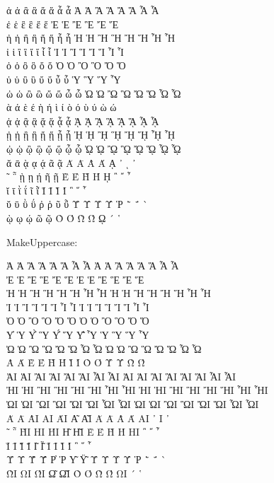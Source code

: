 \documentclass[a4paper]{article}
\begin{document}
ἀ ἁ ἂ ἃ ἄ ἅ ἆ ἇ Ἀ Ἁ Ἂ Ἃ Ἄ Ἅ Ἆ Ἇ \\
ἐ ἑ ἒ ἓ ἔ ἕ     Ἐ Ἑ Ἒ Ἓ Ἔ Ἕ     \\
ἠ ἡ ἢ ἣ ἤ ἥ ἦ ἧ Ἠ Ἡ Ἢ Ἣ Ἤ Ἥ Ἦ Ἧ \\
ἰ ἱ ἲ ἳ ἴ ἵ ἶ ἷ Ἰ Ἱ Ἲ Ἳ Ἴ Ἵ Ἶ Ἷ \\
ὀ ὁ ὂ ὃ ὄ ὅ     Ὀ Ὁ Ὂ Ὃ Ὄ Ὅ     \\
ὐ ὑ ὒ ὓ ὔ ὕ ὖ ὗ   Ὑ   Ὓ   Ὕ   Ὗ \\
ὠ ὡ ὢ ὣ ὤ ὥ ὦ ὧ Ὠ Ὡ Ὢ Ὣ Ὤ Ὥ Ὦ Ὧ \\
ὰ ά ὲ έ ὴ ή ὶ ί ὸ ό ὺ ύ ὼ ώ     \\
ᾀ ᾁ ᾂ ᾃ ᾄ ᾅ ᾆ ᾇ ᾈ ᾉ ᾊ ᾋ ᾌ ᾍ ᾎ ᾏ \\
ᾐ ᾑ ᾒ ᾓ ᾔ ᾕ ᾖ ᾗ ᾘ ᾙ ᾚ ᾛ ᾜ ᾝ ᾞ ᾟ \\
ᾠ ᾡ ᾢ ᾣ ᾤ ᾥ ᾦ ᾧ ᾨ ᾩ ᾪ ᾫ ᾬ ᾭ ᾮ ᾯ \\
ᾰ ᾱ ᾲ ᾳ ᾴ   ᾶ ᾷ Ᾰ Ᾱ Ὰ Ά ᾼ ᾽ ι ᾿ \\
῀ ῁ ῂ ῃ ῄ   ῆ ῇ Ὲ Έ Ὴ Ή ῌ ῍ ῎ ῏ \\
ῐ ῑ ῒ ΐ     ῖ ῗ Ῐ Ῑ Ὶ Ί   ῝ ῞ ῟ \\
ῠ ῡ ῢ ΰ ῤ ῥ ῦ ῧ Ῠ Ῡ Ὺ Ύ Ῥ ῭ ΅ ` \\
    ῲ ῳ ῴ   ῶ ῷ Ὸ Ό Ὼ Ώ ῼ ´ ῾

MakeUppercase:


\MakeUppercase{ ἀ ἁ ἂ ἃ ἄ ἅ ἆ ἇ Ἀ Ἁ Ἂ Ἃ Ἄ Ἅ Ἆ Ἇ }\\
\MakeUppercase{ ἐ ἑ ἒ ἓ ἔ ἕ     Ἐ Ἑ Ἒ Ἓ Ἔ Ἕ     }\\
\MakeUppercase{ ἠ ἡ ἢ ἣ ἤ ἥ ἦ ἧ Ἠ Ἡ Ἢ Ἣ Ἤ Ἥ Ἦ Ἧ }\\
\MakeUppercase{ ἰ ἱ ἲ ἳ ἴ ἵ ἶ ἷ Ἰ Ἱ Ἲ Ἳ Ἴ Ἵ Ἶ Ἷ }\\
\MakeUppercase{ ὀ ὁ ὂ ὃ ὄ ὅ     Ὀ Ὁ Ὂ Ὃ Ὄ Ὅ     }\\
\MakeUppercase{ ὐ ὑ ὒ ὓ ὔ ὕ ὖ ὗ   Ὑ   Ὓ   Ὕ   Ὗ }\\
\MakeUppercase{ ὠ ὡ ὢ ὣ ὤ ὥ ὦ ὧ Ὠ Ὡ Ὢ Ὣ Ὤ Ὥ Ὦ Ὧ }\\
\MakeUppercase{ ὰ ά ὲ έ ὴ ή ὶ ί ὸ ό ὺ ύ ὼ ώ     }\\
\MakeUppercase{ ᾀ ᾁ ᾂ ᾃ ᾄ ᾅ ᾆ ᾇ ᾈ ᾉ ᾊ ᾋ ᾌ ᾍ ᾎ ᾏ }\\
\MakeUppercase{ ᾐ ᾑ ᾒ ᾓ ᾔ ᾕ ᾖ ᾗ ᾘ ᾙ ᾚ ᾛ ᾜ ᾝ ᾞ ᾟ }\\
\MakeUppercase{ ᾠ ᾡ ᾢ ᾣ ᾤ ᾥ ᾦ ᾧ ᾨ ᾩ ᾪ ᾫ ᾬ ᾭ ᾮ ᾯ }\\
\MakeUppercase{ ᾰ ᾱ ᾲ ᾳ ᾴ   ᾶ ᾷ Ᾰ Ᾱ Ὰ Ά ᾼ ᾽ ι ᾿ }\\
\MakeUppercase{ ῀ ῁ ῂ ῃ ῄ   ῆ ῇ Ὲ Έ Ὴ Ή ῌ ῍ ῎ ῏ }\\
\MakeUppercase{ ῐ ῑ ῒ ΐ     ῖ ῗ Ῐ Ῑ Ὶ Ί   ῝ ῞ ῟ }\\
\MakeUppercase{ ῠ ῡ ῢ ΰ ῤ ῥ ῦ ῧ Ῠ Ῡ Ὺ Ύ Ῥ ῭ ΅ ` }\\
\MakeUppercase{     ῲ ῳ ῴ   ῶ ῷ Ὸ Ό Ὼ Ώ ῼ ´ ῾   }
\end{document}
